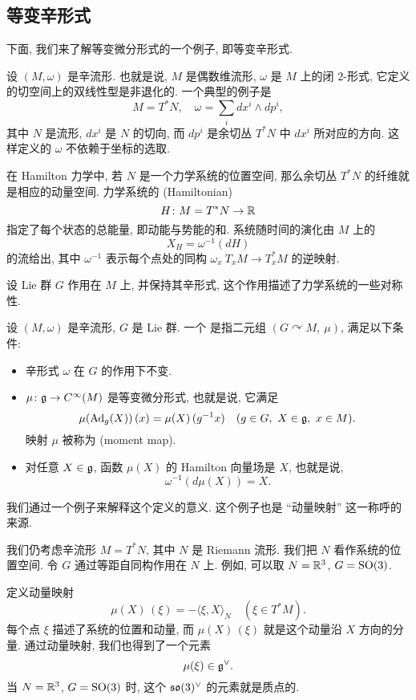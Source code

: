 \subsection{等变辛形式}

下面, 我们来了解等变微分形式的一个例子, 即等变辛形式.

设 $(M, \omega)$ 是辛流形. 也就是说, $M$ 是偶数维流形,
$\omega$ 是 $M$ 上的闭 $2$-形式, 它定义的切空间上的双线性型是非退化的.
一个典型的例子是
\[ \textstyle M = T^* N, \quad \omega = \sum_i dx^i \wedge dp^i, \]
其中 $N$ 是流形, $dx^i$ 是 $N$ 的切向,
而 $dp^i$ 是余切丛 $T^* N$ 中 $dx^i$ 所对应的方向.
这样定义的 $\omega$ 不依赖于坐标的选取.

在 Hamilton 力学中, 若 $N$ 是一个力学系统的位置空间,
那么余切丛 $T^* N$ 的纤维就是相应的动量空间.
力学系统的  (Hamiltonian)
\[ H \colon M = T^* N \to \mathbb{R} \]
指定了每个状态的总能量, 即动能与势能的和. 
系统随时间的演化由 $M$ 上的 
\[ X_H = \omega^{-1} (dH) \]
的流给出, 其中 $\omega^{-1}$ 表示每个点处的同构
$\omega_x \: T_x M \to T_x^* M$ 的逆映射.

设 Lie 群 $G$ 作用在 $M$ 上, 并保持其辛形式,
这个作用描述了力学系统的一些对称性.

\begin{definition}
    设 $(M, \omega)$ 是辛流形, $G$ 是 Lie 群.
    一个 是指二元组
    $(G \curvearrowright M, \ \mu)$, 满足以下条件:
    \begin{itemize}
        \item 
            辛形式 $\omega$ 在 $G$ 的作用下不变.
        \item
            $\mu \colon \mathfrak{g} \to C^\infty (M)$ 是等变微分形式, 也就是说, 它满足
            \[ \mu (\operatorname{Ad}_g (X)) \, (x) = \mu (X) \, (g^{-1} x)
                \quad (g \in G, \ X \in \mathfrak{g}, \ x \in M). \]
            映射 $\mu$ 被称为 (moment map).
        \item
            对任意 $X \in \mathfrak{g}$, 函数 $\mu (X)$ 的 Hamilton 向量场是 $X$,
            也就是说,
            \[ \omega^{-1} (d \mu(X)) = X. \]
    \end{itemize}
\end{definition}

我们通过一个例子来解释这个定义的意义.
这个例子也是 ``动量映射'' 这一称呼的来源.

\begin{example}
    我们仍考虑辛流形 $M = T^* N$, 其中 $N$ 是 Riemann 流形.
    我们把 $N$ 看作系统的位置空间.
    令 $G$ 通过等距自同构作用在 $N$ 上.
    例如, 可以取 $N = \mathbb{R}^3$, $G = \mathrm{SO} (3)$.
    
    定义动量映射
    \[ \mu (X) \, (\xi) = -\langle \xi, X \rangle_N \quad (\xi \in T^* M). \]
    每个点 $\xi$ 描述了系统的位置和动量,
    而 $\mu (X) \, (\xi)$ 就是这个动量沿 $X$ 方向的分量.
    通过动量映射, 我们也得到了一个元素
    \[ \mu (\xi) \in \mathfrak{g}^\vee . \]
    当 $N = \mathbb{R}^3$, $G = \mathrm{SO} (3)$ 时,
    这个 $\mathfrak{so} (3)^\vee$ 的元素就是质点的. \varqed
\end{example}

